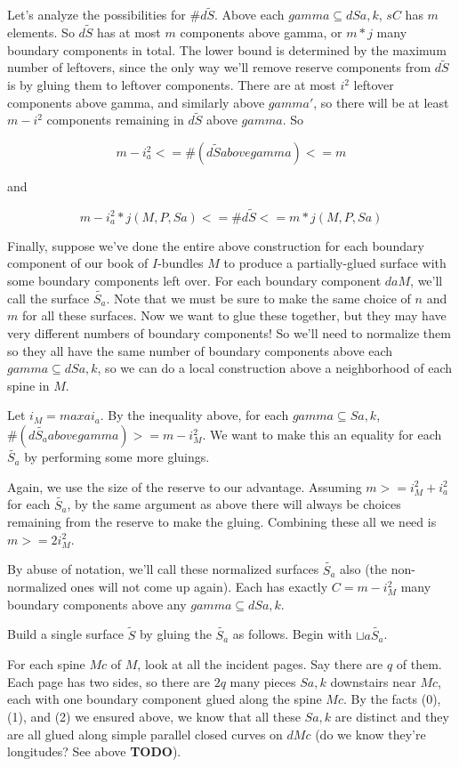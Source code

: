 \documentclass[12pt]{amsart}
\theoremstyle{definition}
\theoremstyle{remark}
\newcommand{\cin}{\subseteq}
\begin{document}
Let's analyze the possibilities for $\#d\widetilde{S}$. Above each $gamma \cin dSa,k$,
$sC$ has $m$ elements. So $d\widetilde{S}$ has at most $m$ components above gamma, or
$m*j$ many boundary components in total. The lower bound is determined by the
maximum number of leftovers, since the only way we'll remove reserve components
from $d\widetilde{S}$ is by gluing them to leftover components. There are at most
$i^2$ leftover components above gamma, and similarly above $gamma'$, so there
will be at least $m - i^2$ components remaining in $d\widetilde{S}$ above $gamma$. So

\[ m-i_a^2 <= \#(d\widetilde{S} above gamma) <= m \]

and

\[ m-i_a^2*j(M,P,Sa) <= \#d\widetilde{S} <= m*j(M,P,Sa) \]

Finally, suppose we've done the entire above construction for each boundary
component of our book of $I$-bundles $M$ to produce a partially-glued surface
with some boundary components left over. For each boundary component $daM$,
we'll call the surface $\widetilde{S_a}$. Note that we must be sure to make the same
choice of $n$ and $m$ for all these surfaces. Now we want to glue these
together, but they may have very different numbers of boundary components! So
we'll need to normalize them so they all have the same number of boundary
components above each $gamma \cin dSa,k$, so we can do a local construction
above a neighborhood of each spine in $M$.

Let $i_M = max a i_a$. By the inequality above, for each $gamma \cin Sa,k$,
$\#(d\widetilde{S_a} above gamma) >= m - i_M^2$. We want to make this an equality for
each $\widetilde{S_a}$ by performing some more gluings.

Again, we use the size of the reserve to our advantage. Assuming $m>=i_M^2
+ i_a^2$ for each $\widetilde{S_a}$, by the same argument as above there will always be
choices remaining from the reserve to make the gluing. Combining these all we
need is $m>= 2i_M^2$.

By abuse of notation, we'll call these normalized surfaces $\widetilde{S_a}$ also (the
non-normalized ones will not come up again). Each has exactly $C = m - i_M^2$
many boundary components above any $gamma \cin dSa,k$.

Build a single surface $\widetilde{S}$ by gluing the $\widetilde{S_a}$ as follows. Begin with
$\sqcup a \widetilde{S_a}$.

For each spine $Mc$ of $M$, look at all the incident pages. Say there are $q$
of them.  Each page has two sides, so there are $2q$ many pieces $Sa,k$
downstairs near $Mc$, each with one boundary component glued along the spine
$Mc$.  By the facts (0), (1), and (2) we ensured above, we know that all these
$Sa,k$ are distinct and they are all glued along simple parallel closed curves
on $dMc$ (do we know they're longitudes?  See above {\bf TODO}).
\end{document}
